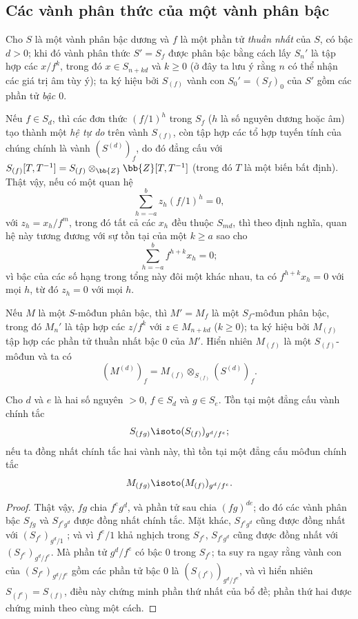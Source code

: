 \documentclass[oneside,10pt]{amsart}
\renewcommand{\geq}{\geqslant}
\newcommand{\oldpage}[2][]{\marginnote{\normalfont\footnotesize\textbf{#1}~|~#2}\ignorespaces}
\let\EGAOriginalLabel\label
\renewcommand{\label}[1]{\phantomsection\EGAOriginalLabel{#1}}
\begin{document}
\subsection{Các vành phân thức của một vành phân bậc}
\label{subsection:II.2.2}

\begin{env}[2.2.1]
\label{II.2.2.1}
Cho $S$ là một vành phân bậc dương và $f$ là một phần tử \emph{thuần nhất} của $S$, có bậc $d>0$; khi đó vành phân thức $S'=S_f$ được phân bậc bằng cách lấy $S_n'$ là tập hợp các $x/f^k$, trong đó $x\in S_{n+kd}$ và $k\geq0$ (ở đây ta lưu ý rằng $n$ có thể nhận các giá trị âm tùy ý); ta ký hiệu bởi $S_{(f)}$ vành con $S_0'=(S_f)_0$ của $S'$ gồm các phần tử \emph{bậc $0$}.

Nếu $f\in S_d$, thì các đơn thức $(f/1)^h$ trong $S_f$ ($h$ là số nguyên dương hoặc âm) tạo thành một \emph{hệ tự do} trên vành $S_{(f)}$, còn tập hợp các tổ hợp tuyến tính của chúng chính là
\oldpage[II]{24}
vành $(S^{(d)})_f$, do đó đẳng cấu với $S_{(f)}[T,T^{-1}]=S_{(f)}\otimes_\bb{Z}\bb{Z}[T,T^{-1}]$ (trong đó $T$ là một biến bất định).
Thật vậy, nếu có một quan hệ
\[
  \sum_{h=-a}^{b}z_h(f/1)^h=0,
\]
với $z_h=x_h/f^m$, trong đó tất cả các $x_h$ đều thuộc $S_{md}$, thì theo định nghĩa, quan hệ này tương đương với sự tồn tại của một $k\geq a$ sao cho
\[
  \sum_{h=-a}^{b}f^{h+k}x_h=0;
\]
vì bậc của các số hạng trong tổng này đôi một khác nhau, ta có $f^{h+k}x_h=0$ với mọi $h$, từ đó $z_h=0$ với mọi $h$.

Nếu $M$ là một $S$-môđun phân bậc, thì $M'=M_f$ là một $S_f$-môđun phân bậc, trong đó $M_n'$ là tập hợp các $z/f^k$ với $z\in M_{n+kd}$ ($k\geq0$); ta ký hiệu bởi $M_{(f)}$ tập hợp các phần tử thuần nhất bậc $0$ của $M'$.
Hiển nhiên $M_{(f)}$ là một $S_{(f)}$-môđun và ta có
\[
  (M^{(d)})_f=M_{(f)}\otimes_{S_{(f)}}(S^{(d)})_f.
\]
\end{env}

\begin{lemma}[2.2.2]
\label{II.2.2.2}
Cho $d$ và $e$ là hai số nguyên $>0$, $f\in S_d$ và $g\in S_e$.
Tồn tại một đẳng cấu vành chính tắc
\[
  S_{(fg)}\isoto(S_{(f)})_{g^d/f^e};
\]
nếu ta đồng nhất chính tắc hai vành này, thì tồn tại một đẳng cấu môđun chính tắc
\[
  M_{(fg)}\isoto(M_{(f)})_{g^d/f^e}.
\]
\end{lemma}

\begin{proof}
Thật vậy, $fg$ chia $f^eg^d$, và phần tử sau chia $(fg)^{de}$; do đó các vành phân bậc $S_{fg}$ và $S_{f^eg^d}$ được đồng nhất chính tắc.
Mặt khác, $S_{f^eg^d}$ cũng được đồng nhất với $(S_{f^e})_{g^d/1}$ ; và vì $f^e/1$ khả nghịch trong $S_{f^e}$, $S_{f^eg^d}$ cũng được đồng nhất với $(S_{f^e})_{g^d/f^e}$.
Mà phần tử $g^d/f^e$ có bậc $0$ trong $S_{f^e}$; ta suy ra ngay rằng vành con của $(S_{f^e})_{g^d/f^e}$ gồm các phần tử bậc $0$ là $(S_{(f^e)})_{g^d/f^e}$, và vì hiển nhiên $S_{(f^e)}=S_{(f)}$, điều này chứng minh phần thứ nhất của bổ đề; phần thứ hai được chứng minh theo cùng một cách.
\end{proof}
\end{document}
